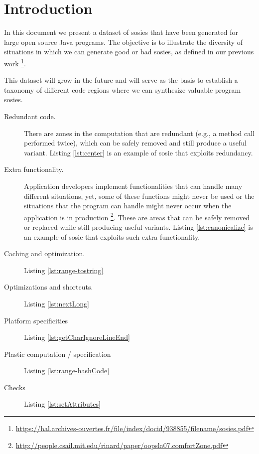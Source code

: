 \section{Introduction}

In this document we present a dataset of sosies that have been generated for large open source Java programs. 
The objective is to illustrate the diversity of situations in which we can generate good or bad sosies, as defined in our previous work \footnote{\url{https://hal.archives-ouvertes.fr/file/index/docid/938855/filename/sosies.pdf}}. 

This dataset will grow in the future and will serve as the basis to establish a taxonomy of different code regions where we can synthesize valuable program sosies. 

\begin{description}
  \item [Redundant code.] There are zones in the computation that are redundant (e.g., a method call performed twice), which can be safely removed and still produce a useful variant. Listing  \ref{lst:center} is an example of sosie that exploits redundancy.
  \item [Extra functionality.] Application developers implement functionalities that can handle many different situations, yet, some of these functions might never be used or the situations that the program can handle might never occur when the application is in production \footnote{\url{http://people.csail.mit.edu/rinard/paper/oopsla07.comfortZone.pdf}}. These are areas that can be safely removed or replaced while still producing useful variants. Listing \ref{lst:canonicalize} is an example of sosie that exploits such extra functionality.
  \item [Caching and optimization.] Listing \ref{lst:range-tostring} 
  \item [Optimizations and shortcuts.] Listing \ref{lst:nextLong}
  \item [Platform specificities] Listing \ref{lst:getCharIgnoreLineEnd}
  \item [Plastic computation / specification] Listing \ref{lst:range-hashCode}
  \item [Checks] Listing \ref{lst:setAttributes}
\end{description}